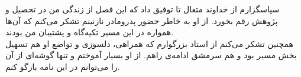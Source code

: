 
سپاسگزارم از خداوند متعال تا توفیق داد که این فصل از زندگی من در تحصیل و پژوهش رقم بخورد. از او به خاطر حضور پدرومادر نازنینم تشکر می‌کنم که آن‌ها همواره در این مسیر تکیه‌گاه و پشتیبان من بودند.\\
همچنین تشکر می‌کنم از استاد بزرگوارم که همراهی، دلسوزی و تواضع او هم تسهیل بخش مسیر بود و هم سرمشق ادامه‌ی راهم. از او بسیار آموختم و تنها گوشه‌ای از آن را می‌توانم در این نامه بازگو کنم.
